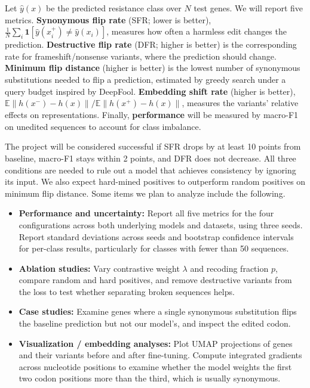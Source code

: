 \documentclass{article}
\begin{document}
Let $\hat{y}(x)$ be the predicted resistance class over $N$ test genes.
We will report five metrics.
\textbf{Synonymous flip rate} (SFR; lower is better),
$\frac{1}{N}\sum_i
\mathbf{1}[\hat{y}(x_i^+)\neq\hat{y}(x_i)]$,
measures how often a harmless edit changes the prediction.
\textbf{Destructive flip rate} (DFR; higher is better) is the
corresponding rate for frameshift/nonsense variants, where the
prediction should change.
\textbf{Minimum flip distance} (higher is better) is the lowest
number of synonymous substitutions needed to flip a prediction,
estimated by greedy search under a query budget inspired by DeepFool.
\textbf{Embedding shift rate} (higher is better),
$\mathbb{E}\|h(x^-)-h(x)\|/
\mathbb{E}\|h(x^+)-h(x)\|$,
measures the variants' relative effects on representations.
Finally, \textbf{performance} will be measured by macro-F1 on unedited
sequences to account for class imbalance.

The project will be considered successful if SFR drops by at least
10 points from baseline, macro-F1 stays within 2 points, and DFR
does not decrease. All three conditions are needed to rule out a
model that achieves consistency by ignoring its input. We also
expect hard-mined positives to outperform random positives on
minimum flip distance. Some items we plan to analyze include the following.


\begin{itemize}
  \item \textbf{Performance and uncertainty:}
  Report all five metrics for the four configurations across both
  underlying models and datasets, using three seeds. Report standard
  deviations across seeds and bootstrap confidence intervals for
  per-class results, particularly for classes with fewer than
  50 sequences.

  \item \textbf{Ablation studies:}
  Vary contrastive weight $\lambda$ and recoding fraction $p$,
  compare random and hard positives, and remove destructive variants
  from the loss to test whether separating broken sequences helps.

  \item \textbf{Case studies:}
  Examine genes where a single synonymous substitution flips the
  baseline prediction but not our model's, and inspect the edited
  codon.

  \item \textbf{Visualization / embedding analyses:}
  Plot UMAP projections of genes and their variants before and after
  fine-tuning. Compute integrated gradients across nucleotide
  positions to examine whether the model weights the first two
  codon positions more than the third, which is usually synonymous.
\end{itemize}
\end{document}

